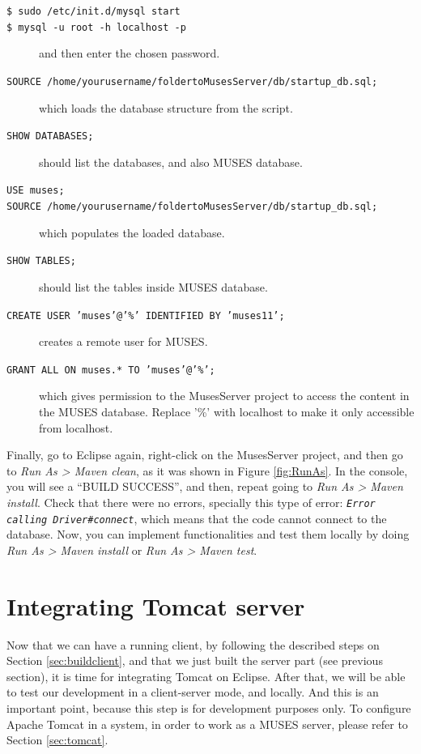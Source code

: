 \begin{description}
  \item[\texttt{\$ sudo /etc/init.d/mysql start}] 
  \item[\texttt{\$ mysql -u root -h localhost -p}] and then enter the chosen password.
  \item[\texttt{SOURCE /home/yourusername/foldertoMusesServer/db/startup\_db.sql;}] which loads the database structure from the script.
  \item[\texttt{SHOW DATABASES;}] should list the databases, and also MUSES database.
  \item[\texttt{USE muses;}]
  \item[\texttt{SOURCE /home/yourusername/foldertoMusesServer/db/startup\_db.sql;}] which populates the loaded database.
  \item[\texttt{SHOW TABLES;}] should list the tables inside MUSES database.
  \item[\texttt{CREATE USER 'muses'@'\%' IDENTIFIED BY 'muses11';}] creates a remote user for MUSES.
  \item[\texttt{GRANT ALL ON muses.* TO 'muses'@'\%';}] which gives permission to the MusesServer project to access the content in the MUSES database. Replace '\%' with localhost to make it only accessible from localhost.
\end{description}

Finally, go to Eclipse again, right-click on the MusesServer project, and then go to \textit{Run As > Maven clean}, as it was shown in Figure \ref{fig:RunAs}. In the console, you will see a ``BUILD SUCCESS'', and then, repeat going to \textit{Run As > Maven install}. Check that there were no errors, specially this type of error: \texttt{\textit{Error calling Driver\#connect}}, which means that the code cannot connect to the database. Now, you can implement functionalities and test them locally by doing \textit{Run As > Maven install} or \textit{Run As > Maven test}.

\section{Integrating Tomcat server}
\label{sec:eclipsetomcat}

Now that we can have a running client, by following the described steps on Section \ref{sec:buildclient}, and that we just built the server part (see previous section), it is time for integrating Tomcat on Eclipse. After that, we will be able to test our development in a client-server mode, and locally. And this is an important point, because this step is for development purposes only. To configure Apache Tomcat in a system, in order to work as a MUSES server, please refer to Section \ref{sec:tomcat}.

